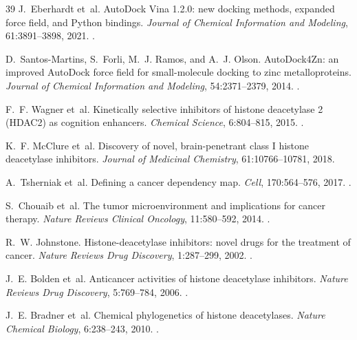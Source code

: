 \begin{thebibliography}{39}
J.~Eberhardt et~al.
\newblock AutoDock Vina 1.2.0: new docking methods, expanded force field, and Python bindings.
\newblock \emph{Journal of Chemical Information and Modeling}, 61:3891--3898, 2021.
\newblock {}.

D.~Santos-Martins, S.~Forli, M.~J. Ramos, and A.~J. Olson.
\newblock AutoDock4Zn: an improved AutoDock force field for small-molecule docking to zinc metalloproteins.
\newblock \emph{Journal of Chemical Information and Modeling}, 54:2371--2379, 2014.
\newblock {}.

F.~F. Wagner et~al.
\newblock Kinetically selective inhibitors of histone deacetylase 2 (HDAC2) as cognition enhancers.
\newblock \emph{Chemical Science}, 6:804--815, 2015.
\newblock {}.

K.~F. McClure et~al.
\newblock Discovery of novel, brain-penetrant class I histone deacetylase inhibitors.
\newblock \emph{Journal of Medicinal Chemistry}, 61:10766--10781, 2018.

A.~Tsherniak et~al.
\newblock Defining a cancer dependency map.
\newblock \emph{Cell}, 170:564--576, 2017.
\newblock {}.

S.~Chouaib et~al.
\newblock The tumor microenvironment and implications for cancer therapy.
\newblock \emph{Nature Reviews Clinical Oncology}, 11:580--592, 2014.
\newblock {}.

R.~W. Johnstone.
\newblock Histone-deacetylase inhibitors: novel drugs for the treatment of cancer.
\newblock \emph{Nature Reviews Drug Discovery}, 1:287--299, 2002.
\newblock {}.

J.~E. Bolden et~al.
\newblock Anticancer activities of histone deacetylase inhibitors.
\newblock \emph{Nature Reviews Drug Discovery}, 5:769--784, 2006.
\newblock {}.

J.~E. Bradner et~al.
\newblock Chemical phylogenetics of histone deacetylases.
\newblock \emph{Nature Chemical Biology}, 6:238--243, 2010.
\newblock {}.


\end{thebibliography}
